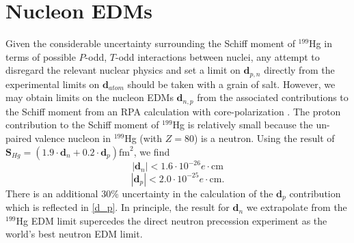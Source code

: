 \documentclass [10pt, twoside] {uwthesis}[2012/04/02]
\begin{document}
\section{Nucleon EDMs}
Given the considerable uncertainty surrounding the Schiff moment of $^{199}$Hg in terms of possible $P$-odd, $T$-odd interactions between nuclei, any attempt to disregard the relevant nuclear physics and set a limit on $\mathbf{d}_{p,n}$ directly from the experimental limits on $\mathbf{d}_{atom}$ should be taken with a grain of salt. However, we may obtain limits on the nucleon EDMs $\mathbf{d}_{n,p}$ from the associated contributions to the Schiff moment from an RPA calculation with core-polarization \cite{2003_Dmitriev_and_Sen'kov_Hg_Schiff_Moment}. The proton contribution to the Schiff moment of $^{199}$Hg is relatively small because the un-paired valence nucleon in $^{199}$Hg (with $Z=80$) is a neutron. Using the result of \cite{2003_Dmitriev_and_Sen'kov_Hg_Schiff_Moment} $\mathbf{S}_{Hg} = (1.9 \cdot \mathbf{d}_n + 0.2 \cdot \mathbf{d}_p) \text{fm}^2$, we find
\begin{equation} \label{d_n}
|\mathbf{d}_n| < 1.6\cdot 10^{-26} e\cdot\text{cm} 
\end{equation}
\begin{equation} \label{d_p}
|\mathbf{d}_p| < 2.0\cdot 10^{-25} e\cdot\text{cm}. 
\end{equation}
There is an additional 30\% uncertainty in the calculation of the $\mathbf{d}_p$ contribution which is reflected in \ref{d_p}. In principle, the result for $\mathbf{d}_n$ we extrapolate from the $^{199}$Hg EDM limit supercedes the direct neutron precession experiment \cite{2015_ILL_nEDM_gravity_correction} as the world's best neutron EDM limit.
\end{document}
